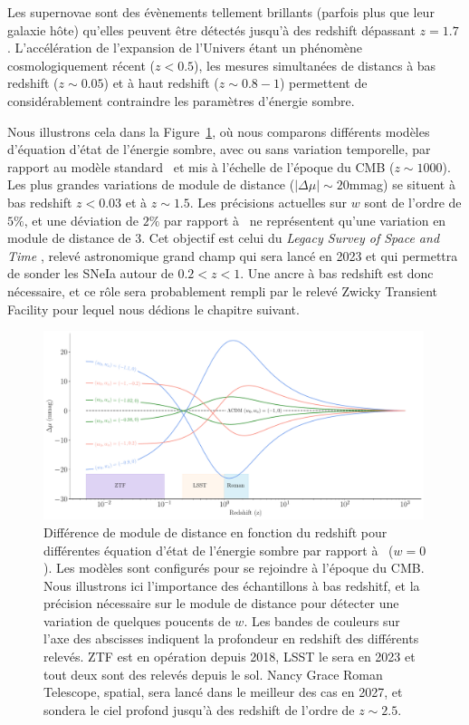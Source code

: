\documentclass[../main/main.tex]{subfiles}
\begin{document}
Les supernovae sont des évènements tellement brillants (parfois plus que
leur galaxie hôte) qu'elles peuvent être détectés jusqu'à des redshift
dépassant $z=1.7$ \citep{Rubin2013, Jones2013}. L'accélération de
l'expansion de l'Univers étant un phénomène cosmologiquement récent
($z<0.5$), les mesures simultanées de distancs à bas redshift ($z\sim0.05$) et à
haut redshift ($z\sim0.8-1$) permettent de considérablement contraindre
les paramètres d'énergie sombre.

Nous illustrons cela dans la Figure~\ref{fig:evolv_DEstate}, où nous
comparons différents modèles d'équation d'état de l'énergie sombre, avec
ou sans variation temporelle, par rapport au modèle standard \lcdm\ et
mis à l'échelle de l'époque du CMB ($z\sim1000$). Les plus grandes
variations de module de distance ($\lvert\Delta\mu\rvert\sim20$mmag) se situent à bas
redshift $z<0.03$ et à $z\sim1.5$. Les précisions actuelles sur $w$ sont
de l'ordre de $5\%$, et une déviation de $2\%$ par rapport à \lcdm\ ne
représentent qu'une variation en module de distance de
$3$\textperthousand. Cet objectif est celui du \textit{Legacy Survey of Space and Time} \citep[LSST;][]{LSSTbook2}, relevé
astronomique grand champ qui sera lancé en 2023 et qui permettra de
sonder les SNeIa autour de $0.2<z<1$. Une ancre à bas redshift est donc
nécessaire, et ce rôle sera probablement rempli par le relevé Zwicky
Transient Facility \citep[ZTF;][]{GrahamZTF2019,BellmZTF2019} pour
lequel nous dédions le chapitre suivant.

\begin{figure}[ht]
  \centering
  \includegraphics[width=0.99\textwidth]{../figures/01_cosmology/darkenergy_variation.pdf}
  \caption[Différence de module de distance en fonction du redshift pour
  différentes équation d'état de l'énergie sombre.]{Différence de module de distance en fonction du redshift pour
  différentes équation d'état de l'énergie sombre par rapport à \lcdm\
  ($w=0$). Les modèles sont configurés pour se rejoindre à l'époque du
  CMB. Nous illustrons ici l'importance des échantillons à bas redshitf,
et la précision nécessaire sur le module de distance pour détecter une
variation de quelques poucents de $w$. Les bandes de couleurs sur l'axe
des abscisses indiquent la profondeur en redshift des différents
relevés. ZTF est en opération depuis 2018, LSST le sera en 2023 et tout
deux sont des relevés depuis le sol. Nancy Grace Roman Telescope, spatial, sera
lancé dans le meilleur des cas en 2027, et sondera le ciel profond
jusqu'à des redshift de l'ordre de $z\sim2.5$.} 
  \label{fig:evolv_DEstate}
\end{figure}
\end{document}
